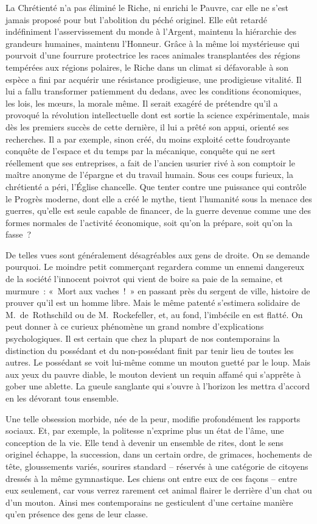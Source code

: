 \documentclass[french,twoside]{book} %
\begin{document}
\bigbreak
\noindent La Chrétienté n’a pas éliminé le Riche, ni enrichi le Pauvre, car elle ne s’est jamais proposé pour but l’abolition du péché originel. Elle eût retardé indéfiniment l’asservissement du monde à l’Argent, maintenu la hiérarchie des grandeurs humaines, maintenu l’Honneur. Grâce à la même loi mystérieuse qui pourvoit d’une fourrure protectrice les races animales transplantées des régions tempérées aux régions polaires, le Riche dans un climat si défavorable à son espèce a fini par acquérir une résistance prodigieuse, une prodigieuse vitalité. Il lui a fallu transformer patiemment du dedans, avec les conditions économiques, les lois, les mœurs, la morale même. Il serait exagéré de prétendre qu’il a provoqué la révolution intellectuelle dont est sortie la science expérimentale, mais dès les premiers succès de cette dernière, il lui a prêté son appui, orienté ses recherches. Il a par exemple, sinon créé, du moins exploité cette foudroyante conquête de l’espace et du temps par la mécanique, conquête qui ne sert réellement que ses entreprises, a fait de l’ancien usurier rivé à son comptoir le maître anonyme de l’épargne et du travail humain. Sous ces coups furieux, la chrétienté a péri, l’Église chancelle. Que tenter contre une puissance qui contrôle le Progrès moderne, dont elle a créé le mythe, tient l’humanité sous la menace des guerres, qu’elle est seule capable de financer, de la guerre devenue comme une des formes normales de l’activité économique, soit qu’on la prépare, soit qu’on la fasse ?\par
De telles vues sont généralement désagréables aux gens de droite. On se demande pourquoi. Le moindre petit commerçant regardera comme un ennemi dangereux de la société l’innocent poivrot qui vient de boire sa paie de la semaine, et murmure : « Mort aux vaches ! » en passant près du sergent de ville, histoire de prouver qu’il est un homme libre. Mais le même patenté s’estimera solidaire de M. de Rothschild ou de M. Rockefeller, et, au fond, l’imbécile en est flatté. On peut donner à ce curieux phénomène un grand nombre d’explications psychologiques. Il est certain que chez la plupart de nos contemporains la distinction du possédant et du non-possédant finit par tenir lieu de toutes les autres. Le possédant se voit lui-même comme un mouton guetté par le loup. Mais aux yeux du pauvre diable, le mouton devient un requin affamé qui s’apprête à gober une ablette. La gueule sanglante qui s’ouvre à l’horizon les mettra d’accord en les dévorant tous ensemble.\par
Une telle obsession morbide, née de la peur, modifie profondément les rapports sociaux. Et, par exemple, la politesse n’exprime plus un état de l’âme, une conception de la vie. Elle tend à devenir un ensemble de rites, dont le sens originel échappe, la succession, dans un certain ordre, de grimaces, hochements de tête, gloussements variés, sourires standard – réservés à une catégorie de citoyens dressés à la même gymnastique. Les chiens ont entre eux de ces façons – entre eux seulement, car vous verrez rarement cet animal flairer le derrière d’un chat ou d’un mouton. Ainsi mes contemporains ne gesticulent d’une certaine manière qu’en présence des gens de leur classe.\par
\end{document}
